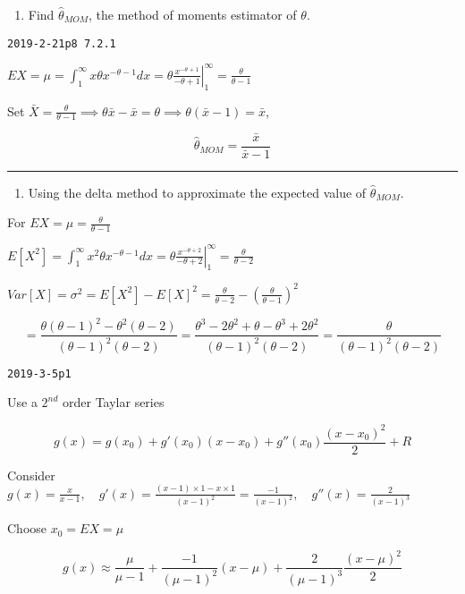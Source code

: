 \documentclass[12pt,]{article}
\providecommand{\tightlist}{%
  \setlength{\itemsep}{0pt}\setlength{\parskip}{0pt}}
\begin{document}
\begin{enumerate}
\def\labelenumi{\alph{enumi}.}
\tightlist
\item
  \textcolor[rgb]{0.5,0.5,0.5}{Find $\hat\theta_{MOM}$, the method of moments estimator of $\theta$.}
\end{enumerate}

\texttt{2019-2-21p8\ 7.2.1}

\(EX=\mu=\int_1^{\infty}x\theta x^{-\theta-1}dx=\left.\theta\frac{x^{-\theta+1}}{-\theta+1}\right|_1^{\infty}=\frac\theta{\theta-1}\)

Set
\(\bar X=\frac\theta{\theta-1}\implies\theta\bar x-\bar x=\theta\implies\theta(\bar x-1)=\bar x\),

\[\hat\theta_{MOM}=\frac{\bar x}{\bar x-1}\]

\begin{center}\rule{0.5\linewidth}{\linethickness}\end{center}

\begin{enumerate}
\def\labelenumi{\alph{enumi}.}
\setcounter{enumi}{1}
\tightlist
\item
  \textcolor[rgb]{0.5,0.5,0.5}{Using the delta method to approximate the expected value of $\hat\theta_{MOM}$.}
\end{enumerate}

For \(EX=\mu=\frac\theta{\theta-1}\)

\(E[X^2]=\int_1^{\infty}x^2\theta x^{-\theta-1}dx=\left.\theta\frac{x^{-\theta+2}}{-\theta+2}\right|_1^{\infty}=\frac\theta{\theta-2}\)

\(Var[X]=\sigma^2=E[X^2]-E[X]^2=\frac\theta{\theta-2}-(\frac\theta{\theta-1})^2\)

\[=\frac{\theta(\theta-1)^2-\theta^2(\theta-2)}{(\theta-1)^2(\theta-2)}=\frac{\theta^3-2\theta^2+\theta-\theta^3+2\theta^2}{(\theta-1)^2(\theta-2)}=\frac{\theta}{(\theta-1)^2(\theta-2)}\]

\texttt{2019-3-5p1}

Use a \(2^{nd}\) order Taylar series

\[g(x)=g(x_0)+g'(x_0)(x-x_0)+g''(x_0)\frac{(x-x_0)^2}2+R\]

Consider
\(g(x)=\frac{x}{x-1},\quad g'(x)=\frac{(x-1)\times1-x\times1}{(x-1)^2}=\frac{-1}{(x-1)^2},\quad g''(x)=\frac{2}{(x-1)^3}\)

Choose \(x_0=EX=\mu\)

\[g(x)\approx \frac{\mu}{\mu-1}+\frac{-1}{(\mu-1)^2}(x-\mu)+\frac{2}{(\mu-1)^3}\frac{(x-\mu)^2}2\]
\end{document}
